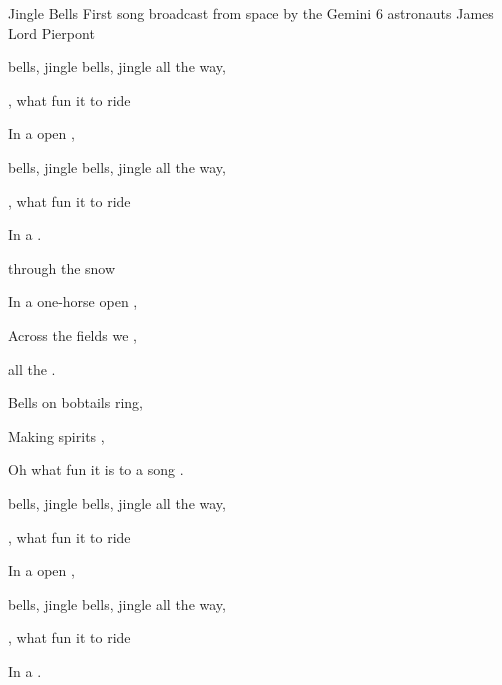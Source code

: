 \begin{SBSong}{Jingle Bells}
    {First song broadcast from space by the Gemini 6 astronauts}
    {James Lord Pierpont}
  \begin{SBVerse}
	 bells, jingle bells, jingle all the way,

	, what fun it  to ride

	In a  open , 

	 bells, jingle bells, jingle all the way,

	, what fun it  to ride

	In a   .
  \end{SBVerse}
  \begin{SBVerse}
	 through the snow

	In a one-horse open ,

	Across the fields we ,

	 all the .

	Bells on bobtails ring,

	Making spirits ,

	Oh what fun it is to  a  song .
  \end{SBVerse}
  \begin{SBVerse}
	 bells, jingle bells, jingle all the way,

	, what fun it  to ride

	In a  open , 

	 bells, jingle bells, jingle all the way,

	, what fun it  to ride
	
	In a   .
  \end{SBVerse}
\end{SBSong}
